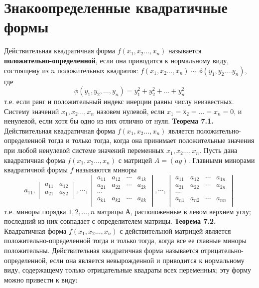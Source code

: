 \documentclass[bachelor, och, coursework, times]{SCWorks}
\newcommand\tab[1][1cm]{\hspace*{#1}}
\newcommand{\tl}{\newline\tab}
\begin{document}
\section{Знакоопределенные квадратичные формы}
\tab Действительная квадратичная форма $f(x_1,x_2…,x_n)$ называется\\ \textbf{положительно-определенной}, если она приводится к нормальному виду, состоящему из $n$ положительных квадратов: $f(x_1,x_2…,x_n) \sim \phi(y_1,y_2….y_n)$, где \newline
$$\phi(y_1,y_2, … ,y_n)=y_1^2+y_2^2+…+y_n^2$$ т.е. если ранг и положительный индекс инерции равны числу неизвестных.
\tl
Систему значений $x_1,x_2…,x_n$ назовем нулевой, если $x_1 = х_2 = ... = x_n = 0$, и ненулевой, если хотя бы одно из них отлично от нуля.
\tl
\textbf{Теорема 7.1.} Действительная квадратичная форма $f(x_1,x_2…,x_n)$ является положительно-определенной тогда и только тогда, когда она принимает положительные значения при любой ненулевой системе значений переменных $x_1,x_2…,x_n$. \cite{berezina}
\tl Пусть дана квадратичная форма $f(x_1,x_2…,x_n)$ с матрицей $A = (ay)$. Главными минорами квадратичной формы $f$ называются миноры  
$$a_{11}, 
\begin{vmatrix}
a_{11} & a_{12} \\ 
a_{21} & a_{22} \\ 
\end{vmatrix},
\cdots
,
\begin{vmatrix}
a_{11} & a_{12} & \cdots & a_{1k} \\ 
a_{21} & a_{22} & \cdots & a_{2k} \\ 
\cdots \\
a_{k1} & a_{k2} & \cdots & a_{kk} \\ 
\end{vmatrix}
,
\cdots
,
\begin{vmatrix}
a_{11} & a_{12} & \cdots & a_{1n} \\ 
a_{21} & a_{22} & \cdots & a_{2n} \\ 
\cdots \\
a_{n1} & a_{n2} & \cdots & a_{nn} \\ 
\end{vmatrix}
$$
\tab т.е. миноры порядка $1, 2, ... , n$ матрицы $А$, расположенные в левом верхнем углу; последний из них совпадает с определителем матрицы.
\tl
\textbf{Теорема 7.2.} Квадратичная форма $f(x_1,x_2…,x_n)$ с действительной матрицей является положительно-определенной тогда и только тогда, когда все ее главные миноры положительны.
\tl
Действительная квадратичная форма называется отрицательно-определенной, если она является невырожденной и приводится к нормальному виду, содержащему только отрицательные квадраты всех переменных; эту форму можно привести к виду:
\end{document}
